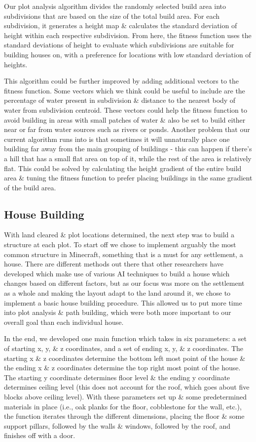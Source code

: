 \documentclass[11pt, oneside]{article}
\begin{document}
\begin{normalsize}
Our plot analysis algorithm divides the randomly selected build area into subdivisions that are based on the size of the total build area. For each subdivision, it generates a height map \& calculates the standard deviation of height within each respective subdivision. From here, the fitness function uses the standard deviations of height to evaluate which subdivisions are suitable for building houses on, with a preference for locations with low standard deviation of heights.

This algorithm could be further improved by adding additional vectors to the fitness function. Some vectors which we think could be useful to include are the percentage of water present in subdivision \& distance to the nearest body of water from subdivision centroid. These vectors could help the fitness function to avoid building in areas with small patches of water \& also be set to build either near or far from water sources such as rivers or ponds. Another problem that our current algorithm runs into is that sometimes it will unnaturally place one building far away from the main grouping of buildings - this can happen if there's a hill that has a small flat area on top of it, while the rest of the area is relatively flat. This could be solved by calculating the height gradient of the entire build area \& tuning the fitness function to prefer placing buildings in the same gradient of the build area.

\subsection{House Building}

With land cleared \& plot locations determined, the next step was to build a structure at each plot. 
To start off we chose to implement arguably the most common structure in Minecraft, something that is a must for any settlement, a house. 
There are different methods out there that other researchers have developed which make use of various AI techniques to build a house which changes based on different factors, but as our focus was more on the settlement as a whole and making the layout adapt to the land around it, we chose to implement a basic house building procedure. 
This allowed us to put more time into plot analysis \& path building, which were both more important to our overall goal than each individual house. 

In the end, we developed one main function which takes in six parameters: a set of starting x, y, \& z coordinates, and a set of ending x, y, \& z coordinates. 
The starting x \& z coordinates determine the bottom left most point of the house \& the ending x \& z coordinates determine the top right most point of the house. 
The starting y coordinate determines floor level \& the ending y coordinate determines ceiling level (this does not account for the roof, which goes about five blocks above ceiling level).
With these parameters set up \& some predetermined materials in place (i.e., oak planks for the floor, cobblestone for the wall, etc.), the function iterates through the different dimensions, placing the floor \& some support pillars, followed by the walls \& windows, followed by the roof, and finishes off with a door. 


\end{normalsize}
\end{document}
